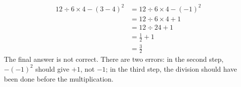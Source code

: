 {\begin{equation*}
	\begin{split}
		12 \div 6 \times 4 - (3-4)^2 &= 12 \div 6 \times 4 - (-1)^2 \\
					     &= 12 \div 6 \times 4 +1 \\
					     &= 12 \div 24 + 1 \\
					     &= \frac{1}{2} + 1 \\
					     &= \frac{3}{2}
	\end{split}
\end{equation*} }
{The final answer is not correct. There are two errors: in the second step, $-(-1)^2$ should give $+1$, not $-1$; in the third step, the division should have been done before the multiplication.}
